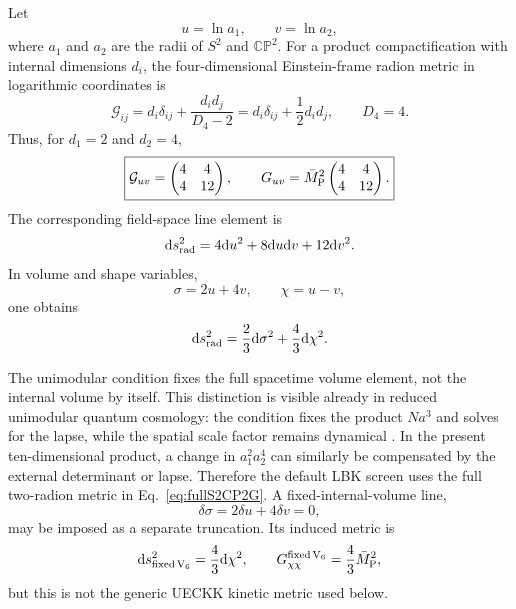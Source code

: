 \documentclass[aps,prd,twocolumn,superscriptaddress,nofootinbib,longbibliography]{revtex4-2}
\newcommand{\Mpl}{\bar M_{\rm P}}
\newcommand{\dd}{\mathrm d}
\newcommand{\CP}{\mathbb{CP}}
\begin{document}
Let
\begin{equation}
 u=\ln a_1,\qquad v=\ln a_2,
\end{equation}
where $a_1$ and $a_2$ are the radii of $S^2$ and $\CP^2$. For a product compactification with internal dimensions $d_i$, the four-dimensional Einstein-frame radion metric in logarithmic coordinates is
\begin{equation}
\mathcal G_{ij}=d_i\delta_{ij}+\frac{d_i d_j}{D_4-2}
=d_i\delta_{ij}+\frac12 d_i d_j,
\qquad D_4=4 .
\label{eq:generalradionmetric}
\end{equation}
Thus, for $d_1=2$ and $d_2=4$,
\begin{equation}
\boxed{
\mathcal G_{uv}=\begin{pmatrix}4&4\\4&12\end{pmatrix},
\qquad
G_{uv}=\Mpl^2\begin{pmatrix}4&4\\4&12\end{pmatrix}.
}
\label{eq:fullS2CP2G}
\end{equation}
The corresponding field-space line element is
\begin{equation}
\dd s_{\rm rad}^2=4\dd u^2+8\dd u\dd v+12\dd v^2.
\end{equation}
In volume and shape variables,
\begin{equation}
\sigma=2u+4v,\qquad \chi=u-v,
\end{equation}
one obtains
\begin{equation}
\dd s_{\rm rad}^2=\frac23\dd\sigma^2+\frac43\dd\chi^2.
\label{eq:diagvolshape}
\end{equation}

The unimodular condition fixes the full spacetime volume element, not the internal volume by itself. This distinction is visible already in reduced unimodular quantum cosmology: the condition fixes the product $Na^3$ and solves for the lapse, while the spatial scale factor remains dynamical \cite{Yamashita2026UnimodularQC}. In the present ten-dimensional product, a change in $a_1^2a_2^4$ can similarly be compensated by the external determinant or lapse. Therefore the default LBK screen uses the full two-radion metric in Eq.~\eqref{eq:fullS2CP2G}. A fixed-internal-volume line,
\begin{equation}
\delta\sigma=2\delta u+4\delta v=0,
\end{equation}
may be imposed as a separate truncation. Its induced metric is
\begin{equation}
\dd s_{\rm fixed\,V_6}^2=\frac43\dd\chi^2,
\qquad
G_{\chi\chi}^{\rm fixed\,V_6}=\frac43\Mpl^2,
\label{eq:Gchichi}
\end{equation}
but this is not the generic UECKK kinetic metric used below.
\end{document}
